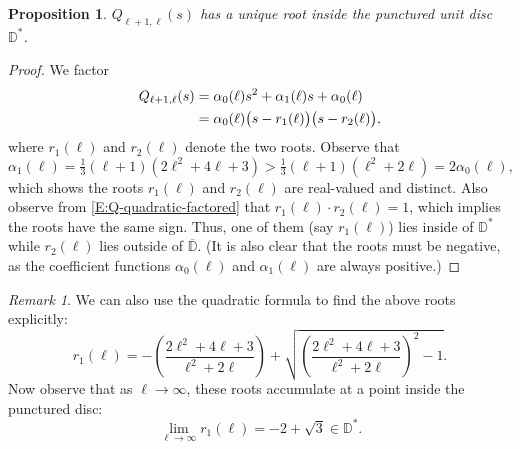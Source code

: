 \documentclass[letterpaper,11pt,reqno]{amsart}
\theoremstyle{plain}
\newtheorem{proposition}[equation]{Proposition}
\theoremstyle{definition}
\theoremstyle{remark}
\theoremstyle{remark}
\newtheorem{remark}[equation]{Remark}
\numberwithin{equation}{section}
\newcommand{\ol}{\overline}
\newcommand{\D}{{\mathbb D}}
\begin{document}
\begin{proposition}\label{P:k=1-unique-root}
$Q_{\ell+1,\ell}(s)$ has a unique root inside the punctured unit disc $\D^*$.
\end{proposition}
\begin{proof} 
We factor
\begin{align}
Q_{\ell+1,\ell}(s) 
&= \alpha_0(\ell) s^2 + \alpha_1(\ell) s + \alpha_0(\ell) \notag \\
&= \alpha_0(\ell) \big(s-r_1(\ell)\big) \big(s-r_2(\ell)\big), \label{E:Q-quadratic-factored}
\end{align}
where $r_1(\ell)$ and $r_2(\ell)$ denote the two roots.
Observe that
\begin{equation}
\alpha_1(\ell) = \tfrac{1}{3}(\ell+1)(2\ell^2+4\ell+3)
>
\tfrac{1}{3}(\ell+1)(\ell^2+2\ell) = 2\alpha_0(\ell),
\end{equation}
which shows the roots $r_1(\ell)$ and $r_2(\ell)$ are real-valued and distinct.
Also observe from \eqref{E:Q-quadratic-factored} that $r_1(\ell) \cdot r_2(\ell) = 1$, which implies the roots have the same sign.
Thus, one of them (say $r_1(\ell)$) lies inside of $\D^*$ while $r_2(\ell)$ lies outside of $\ol{\D}$.
(It is also clear that the roots must be negative, as the coefficient functions $\alpha_0(\ell)$ and $\alpha_1(\ell)$ are always positive.)
\end{proof}

\begin{remark}\label{R:k=1_Limits-of-roots}
We can also use the quadratic formula to find the above roots explicitly:
\begin{equation*}
r_1(\ell) = -\left( \frac{2\ell^2+4\ell+3}{\ell^2+2\ell} \right) + \sqrt{ \left(\frac{2\ell^2+4\ell+3}{\ell^2+2\ell} \right)^2 - 1 }.
\end{equation*}
Now observe that as $\ell \to \infty$, these roots accumulate at a point inside the punctured disc:
\[
\lim_{\ell \to \infty} r_1(\ell) = -2 + \sqrt{3} \in \D^*.
\]
\end{remark}
\end{document}
